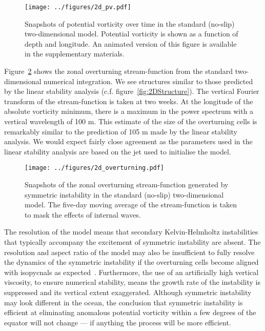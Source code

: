 \begin{figure}
    \centering
    \texttt{[image: ../figures/2d\_pv.pdf]}
    \caption{Snapshots of potential vorticity over time in the standard (no-slip) two-dimensional model. Potential vorticity is shown as a function of depth and longitude. An animated version of this figure is available in the supplementary materials.}
    \label{fig:2DPVSnapshotsStandard}
\end{figure}


Figure~\ref{fig:2DStandardOverturningStreamfunction} shows the zonal overturning stream-function from the standard two-dimensional numerical integration. We see structures similar to those predicted by the linear stability analysis (c.f. figure~\ref{fig:2DStructure}). The vertical Fourier transform of the stream-function is taken at two weeks. At the longitude of the absolute vorticity minimum, there is a maximum in the power spectrum with a vertical wavelength of 100 m. This estimate of the size of the overturning cells is remarkably similar to the prediction of 105 m made by the linear stability analysis. We would expect fairly close agreement as the parameters used in the linear stability analysis are based on the jet used to initialise the model.

\begin{figure}
    \centering
    \texttt{[image: ../figures/2d\_overturning.pdf]}
    \caption{Snapshots of the zonal overturning stream-function generated by symmetric instability in the standard (no-slip) two-dimensional model. The five-day moving average of the stream-function is taken to mask the effects of internal waves.}
    \label{fig:2DStandardOverturningStreamfunction}
\end{figure}

The resolution of the model means that secondary Kelvin-Helmholtz instabilities that typically accompany the excitement of symmetric instability are absent. The resolution and aspect ratio of the model may also be insufficient to fully resolve the dynamics of the symmetric instability if the overturning cells become aligned with isopycnals as expected~\citep{Bachman2014}. Furthermore, the use of an artificially high vertical viscosity, to ensure numerical stability,  means the growth rate of the instability is suppressed and its vertical extent exaggerated. Although symmetric instability may look different in the ocean, the conclusion that symmetric instability is efficient at eliminating anomalous potential vorticity within a few degrees of the equator will not change --- if anything the process will be more efficient.

